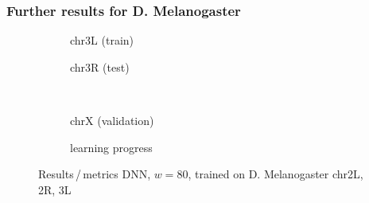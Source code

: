 \subsubsection{Further results for D. Melanogaster} \label{sec:appendix:cgan_drosophila}
\begin{figure}[h!] %
    \begin{subfigure}{0.45\textwidth}
        \scriptsize
        \caption{chr3L (train)}
    \end{subfigure} \hfill
    \begin{subfigure}{0.45\textwidth}
        \scriptsize
        \caption{chr3R (test)}
    \end{subfigure}\\[5mm]
    \begin{subfigure}{0.45\textwidth}
        \scriptsize
        \caption{chrX (validation)}
    \end{subfigure}\hfill
    \begin{subfigure}{0.45\textwidth}
        \scriptsize
        \caption{learning progress} \label{fig:appendix:DNN_drosophila_progress}
    \end{subfigure}
    \caption{Results\,/\,metrics DNN, $w=80$, trained on D. Melanogaster chr2L, 2R, 3L}   \label{fig:appendix:DNN_drosophila_pearson}
\end{figure}

